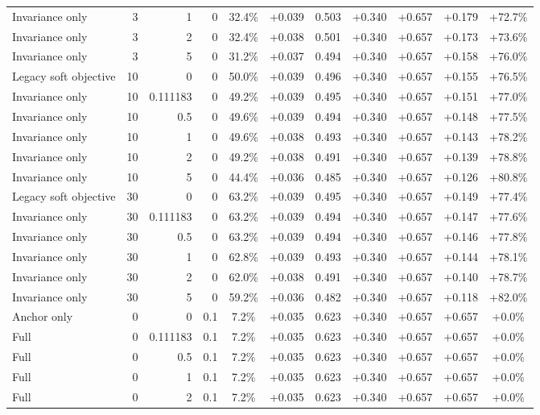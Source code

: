 \begin{table}[htbp]
\begin{tabular}{lrrrccccccc}
Invariance only & 3 & 1 & 0 & 32.4\% & +0.039 & 0.503 & +0.340 & +0.657 & +0.179 & +72.7\% \\
Invariance only & 3 & 2 & 0 & 32.4\% & +0.038 & 0.501 & +0.340 & +0.657 & +0.173 & +73.6\% \\
Invariance only & 3 & 5 & 0 & 31.2\% & +0.037 & 0.494 & +0.340 & +0.657 & +0.158 & +76.0\% \\
Legacy soft objective & 10 & 0 & 0 & 50.0\% & +0.039 & 0.496 & +0.340 & +0.657 & +0.155 & +76.5\% \\
Invariance only & 10 & 0.111183 & 0 & 49.2\% & +0.039 & 0.495 & +0.340 & +0.657 & +0.151 & +77.0\% \\
Invariance only & 10 & 0.5 & 0 & 49.6\% & +0.039 & 0.494 & +0.340 & +0.657 & +0.148 & +77.5\% \\
Invariance only & 10 & 1 & 0 & 49.6\% & +0.038 & 0.493 & +0.340 & +0.657 & +0.143 & +78.2\% \\
Invariance only & 10 & 2 & 0 & 49.2\% & +0.038 & 0.491 & +0.340 & +0.657 & +0.139 & +78.8\% \\
Invariance only & 10 & 5 & 0 & 44.4\% & +0.036 & 0.485 & +0.340 & +0.657 & +0.126 & +80.8\% \\
Legacy soft objective & 30 & 0 & 0 & 63.2\% & +0.039 & 0.495 & +0.340 & +0.657 & +0.149 & +77.4\% \\
Invariance only & 30 & 0.111183 & 0 & 63.2\% & +0.039 & 0.494 & +0.340 & +0.657 & +0.147 & +77.6\% \\
Invariance only & 30 & 0.5 & 0 & 63.2\% & +0.039 & 0.494 & +0.340 & +0.657 & +0.146 & +77.8\% \\
Invariance only & 30 & 1 & 0 & 62.8\% & +0.039 & 0.493 & +0.340 & +0.657 & +0.144 & +78.1\% \\
Invariance only & 30 & 2 & 0 & 62.0\% & +0.038 & 0.491 & +0.340 & +0.657 & +0.140 & +78.7\% \\
Invariance only & 30 & 5 & 0 & 59.2\% & +0.036 & 0.482 & +0.340 & +0.657 & +0.118 & +82.0\% \\
Anchor only & 0 & 0 & 0.1 & 7.2\% & +0.035 & 0.623 & +0.340 & +0.657 & +0.657 & +0.0\% \\
Full & 0 & 0.111183 & 0.1 & 7.2\% & +0.035 & 0.623 & +0.340 & +0.657 & +0.657 & +0.0\% \\
Full & 0 & 0.5 & 0.1 & 7.2\% & +0.035 & 0.623 & +0.340 & +0.657 & +0.657 & +0.0\% \\
Full & 0 & 1 & 0.1 & 7.2\% & +0.035 & 0.623 & +0.340 & +0.657 & +0.657 & +0.0\% \\
Full & 0 & 2 & 0.1 & 7.2\% & +0.035 & 0.623 & +0.340 & +0.657 & +0.657 & +0.0\% \\

\end{tabular}
\end{table}
